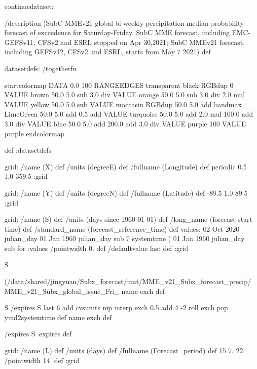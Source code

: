 \begin{ingrid}

continuedataset:

/description (SubC MMEv21 global bi-weekly percipitation median probability forecast of exceedence for Saturday-Friday. SubC MME forecast, including EMC-GEFSv11, CFSv2 and ESRL stopped on Apr 30,2021; SubC MMEv21 forecast, including GEFSv12, CFSv2 and ESRL, starts from May 7 2021) def

datasetdefs:
/togetherfn {
startcolormap 
DATA 0.0 100 RANGEEDGES
    transparent black RGBdup
       0 VALUE
       brown 50.0
         5.0 sub
         3.0 div
         VALUE
         orange 50.0
          5.0 sub
          3.0 div
          2.0 mul
          VALUE
          yellow 50.0
           5.0 sub
           VALUE
          moccasin RGBdup 50.0
             5.0 add
             bandmax
             LimeGreen 50.0
              5.0 add
              0.5 add
              VALUE
              turquoise 50.0
               5.0 add
               2.0 mul
               100.0 add
               3.0 div
               VALUE
               blue 50.0
                5.0 add
                200.0 add
                3.0 div
                VALUE
               purple
                100 VALUE
                purple
endcolormap

} def
:datasetdefs


grid:
/name (X) def
/units (degreeE) def
/fullname (Longitude) def
periodic
0.5 1.0 359.5
:grid

grid:
/name (Y) def
/units (degreeN) def
/fullname (Latitude) def
-89.5 1.0 89.5
:grid


grid:
/name (S) def
/units (days since 1960-01-01) def
/long_name (forecast start time) def
/standard_name (forecast_reference_time) def
values:
02 Oct 2020 julian_day 01 Jan 1960 julian_day sub
7
systemtime
(%
01 Jan 1960 julian_day sub 
{} for
:values
/pointwidth 0. def
/defaultvalue { last } def
:grid

S {(/data/shared/jingyuan/Subx_forecast/mat/MME_v21_Subx_forecast_precip/MME_v21_Subx_global_issue_Fri_%
name exch def

S
/expires
S last 6 add cvsunits nip interp exch 0.5 add 4 -2 roll exch pop ymd2systemtime
def
name exch def

/expires S .expires def


grid:
/name (L) def
/units (days) def
/fullname (Forecast_period) def
15 7. 22
/pointwidth 14. def
:grid

}
\end{ingrid}
